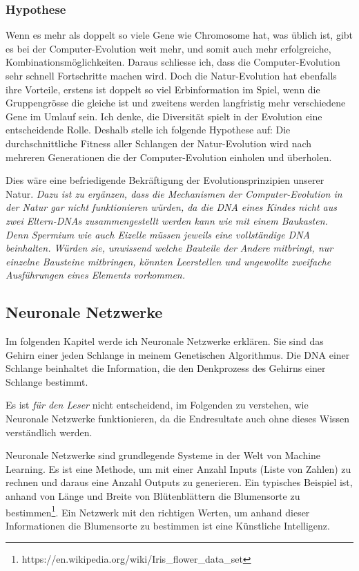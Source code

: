 \documentclass[11pt,a4paper,ngerman]{article}
\begin{document}
\subsubsection{Hypothese}

Wenn es mehr als doppelt so viele Gene wie Chromosome hat, was üblich ist, gibt es bei der Computer-Evolution weit mehr, und somit auch mehr erfolgreiche, Kombinationsmöglichkeiten. Daraus schliesse ich, dass die Computer-Evolution sehr schnell Fortschritte machen wird. Doch die Natur-Evolution hat ebenfalls ihre Vorteile, erstens ist doppelt so viel Erbinformation im Spiel, wenn die Gruppengrösse die gleiche ist und zweitens werden langfristig mehr verschiedene Gene im Umlauf sein. Ich denke, die Diversität spielt in der Evolution eine entscheidende Rolle. Deshalb stelle ich folgende Hypothese auf: Die durchschnittliche Fitness aller Schlangen der Natur-Evolution wird nach mehreren Generationen die der Computer-Evolution einholen und überholen. 

Dies wäre eine befriedigende Bekräftigung der Evolutionsprinzipien unserer Natur. \textit{Dazu ist zu ergänzen, dass die Mechanismen der Computer-Evolution in der Natur gar nicht funktionieren würden, da die DNA eines Kindes nicht aus zwei Eltern-DNAs zusammengestellt werden kann wie mit einem Baukasten. Denn Spermium wie auch Eizelle müssen jeweils eine vollständige DNA beinhalten. Würden sie, unwissend welche Bauteile der Andere mitbringt, nur einzelne Bausteine mitbringen, könnten Leerstellen und ungewollte zweifache Ausführungen eines Elements vorkommen.}

\subsection{Neuronale Netzwerke} \label{sec:NN}

Im folgenden Kapitel werde ich Neuronale Netzwerke erklären. Sie sind das Gehirn einer jeden Schlange in meinem Genetischen Algorithmus. Die DNA einer Schlange beinhaltet die Information, die den Denkprozess des Gehirns einer Schlange bestimmt.

\bigskip
Es ist \textit{für den Leser} nicht entscheidend, im Folgenden zu verstehen, wie Neuronale Netzwerke funktionieren, da die Endresultate auch ohne dieses Wissen verständlich werden.

\bigskip
Neuronale Netzwerke sind grundlegende Systeme in der Welt von Machine Learning. Es ist eine Methode, um mit einer Anzahl Inputs (Liste von Zahlen) zu rechnen und daraus eine Anzahl Outputs zu generieren. Ein typisches Beispiel ist, anhand von Länge und Breite von Blütenblättern die Blumensorte zu bestimmen\footnote{https://en.wikipedia.org/wiki/Iris\_flower\_data\_set}. Ein Netzwerk mit den richtigen Werten, um anhand dieser Informationen die Blumensorte zu bestimmen ist eine Künstliche Intelligenz.
\end{document}
